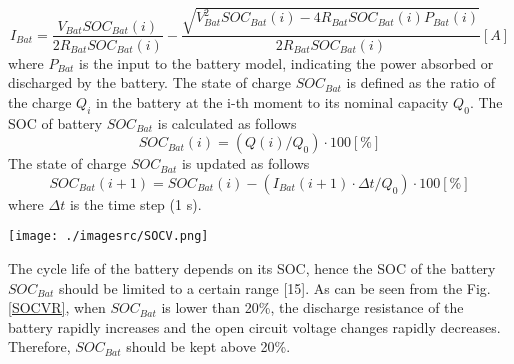 \documentclass[energies,article,submit,moreauthors,pdftex,10pt,a4paper]{Definitions/mdpi}
\begin{document}
\begin{equation}
{I_{Bat}} = \frac{{{V_{Bat}}SO{C_{Bat}}\left( i \right)}}{{2{R_{Bat}}SO{C_{Bat}}\left( i \right)}} - \frac{{\sqrt {V_{Bat}^2SO{C_{Bat}}\left( i \right) - 4{R_{Bat}}SO{C_{Bat}}\left( i \right){P_{Bat}}\left( i \right)} }}{{2{R_{Bat}}SO{C_{Bat}}\left( i \right)}}\left[ A \right]
\end{equation}
where  $P_{Bat}$ is the input to the battery model, indicating the power absorbed or discharged by the battery.
The state of charge $SO{C_{Bat}}$ is defined as the ratio of the charge ${Q_i}$ in the battery at the i-th moment to its nominal capacity ${Q_0}$. The SOC of battery $SO{C_{Bat}}$ is calculated as follows
\begin{equation}
SO{C_{Bat}}\left( i \right) = \left( {Q\left( i \right)/{Q_0}} \right) \cdot 100\left[ \%  \right]
\end{equation}
The  state of charge $SO{C_{Bat}} $ is updated as follows
\begin{equation}
SO{C_{Bat}}\left( {i + 1} \right) = SO{C_{Bat}}\left( i \right) - \left( {{I_{Bat}}\left( {i + 1} \right) \cdot \Delta t/{Q_0}} \right) \cdot 100\left[ \%  \right]
\end{equation}
where $\Delta t$ is the time step (1 s).

\begin{figure*}[ht]
\centering
\texttt{[image: ./imagesrc/SOCV.png]}
\caption{$V_{Bat}$ and $R_{Bat}$ vs. $SOC_{Bat}$}
\label{SOCVR}
\end{figure*}

The cycle life of the battery depends on its SOC, hence the SOC of the battery ${SOC_{Bat}}$ should be limited to a certain range [15]. As can be seen from the Fig.\ref{SOCVR}, when ${SOC_{Bat}}$  is lower than 20\%, the discharge resistance of the battery rapidly increases and the open circuit voltage changes rapidly decreases. Therefore, ${SOC_{Bat}}$ should be kept above 20\%.
\end{document}
